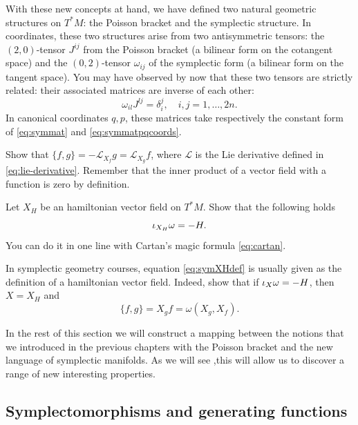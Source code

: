 \documentclass[english,fontsize=11pt,paper=a5,oneside]{scrbook}
\newcommand{\cL}{\mathcal{L}}
\let\d\relax
\newcommand{\d}{\mathrm{d}}
\theoremstyle{definition}
\newenvironment{exercise}
  {\pushQED{\qed}\renewcommand{\qedsymbol}{$\maltese$}\exercisex}
  {\popQED\endexercisex}
\begin{document}
With these new concepts at hand, we have defined two natural geometric structures on $T^* M$: the Poisson bracket and the symplectic structure.
In coordinates, these two structures arise from two antisymmetric tensors: the $(2,0)$-tensor $J^{ij}$ from the Poisson bracket (a bilinear form on the cotangent space) and the $(0,2)$-tensor $\omega_{ij}$ of the symplectic form (a bilinear form on the tangent space).
You may have observed by now that these two tensors are strictly related: their associated matrices are inverse of each other:
\begin{equation}\label{eq:omegaJinverse}
  \omega_{il}J^{lj} = \delta_i^j, \quad i,j = 1,\ldots, 2n.
\end{equation}
In canonical coordinates $q,p$, these matrices take respectively the constant form of \eqref{eq:symmat} and \eqref{eq:symmatpqcoords}.

\begin{exercise}
  Show that $\big\{f,g\big\} = -\cL_{X_f} g = \cL_{X_g} f$, where $\cL$ is the Lie derivative defined in \eqref{eq:lie-derivative}.
  Remember that the inner product of a vector field with a function is zero by definition.
\end{exercise}

\begin{exercise}\label{exe:altdefomega}
  Let $X_H$ be an hamiltonian vector field on $T^*M$.
  Show that the following holds
  \begin{equation}\label{eq:symXHdef}
    \iota_{X_H}\omega = -\d H.
  \end{equation}
  You can do it in one line with Cartan's magic formula \eqref{eq:cartan}.

  In symplectic geometry courses, equation \eqref{eq:symXHdef} is usually given as the definition of a hamiltonian vector field.
  Indeed, show that if $\iota_{X}\omega = -\d H$, then $X=X_H$ and
  \begin{equation}
    \{f,g\} = X_g f = \omega(X_g, X_f).
  \end{equation}
\end{exercise}

In the rest of this section we will construct a mapping between the notions that we introduced in the previous chapters with the Poisson bracket and the new language of symplectic manifolds.
As we will see ,this will allow us to discover a range of new interesting properties.

\subsection{Symplectomorphisms and generating functions}
\end{document}
